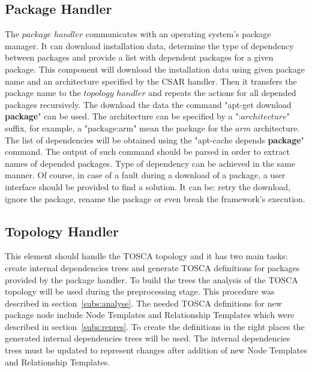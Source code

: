 \subsection{Package Handler} \label{subs:archph}
The $package$ $handler$ communicates with an operating system's package manager. 
It can download installation data, determine the type of dependency between packages and provide a list with dependent packages for a given package.
This component will download the installation data using given package name and an architecture specified by the CSAR handler.
Then it transfers the package name to the $topology$ $handler$ and repeats the actions for all depended packages recursively. 
The download the data the command "apt-get download \textbf{package}" can be used. 
The architecture can be specified by a ":$architecture$" suffix, for example, a "package:arm" mean the package for the $arm$ architecture.
The list of dependencies will be obtained using the "apt-cache depends \textbf{package}" command. 
The output of such command should be parsed in order to extract names of depended packages.
Type of dependency can be achieved in the same manner.
Of course, in case of a fault during a download of a package, a user interface should be provided to find a solution.
It can be: retry the download, ignore the package, rename the package or even break the framework's execution.

\subsection{Topology Handler} \label{subs:archtop}
This element should handle the TOSCA topology and it has two main tasks: create internal dependencies trees and generate TOSCA definitions for packages provided by the package handler.
To build the trees the analysis of the TOSCA topology will be used during the preprocessing stage.
This procedure was described in section~\ref{subs:analyse}.
The needed TOSCA definitions for new package node include Node Templates and Relationship Templates which were described in section~\ref{subs:repres}.
To create the definitions in the right places the generated internal dependencies trees will be used.
The internal dependencies trees must be updated to represent changes after addition of new Node Templates and Relationship Templates.

